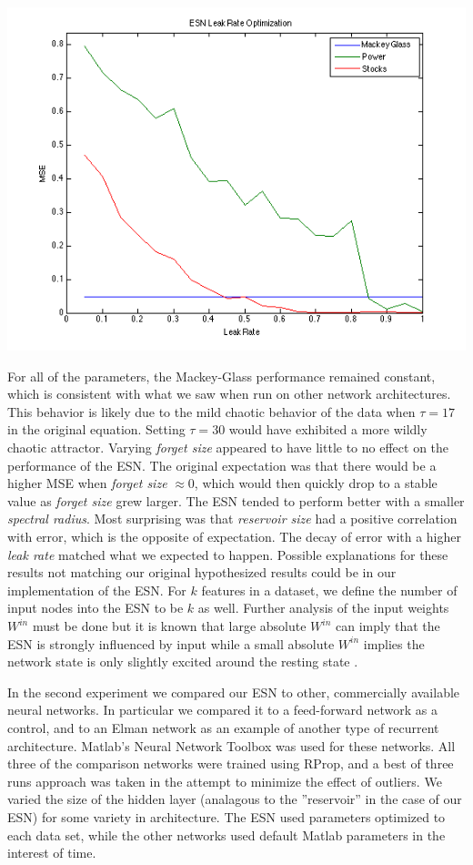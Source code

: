 \documentclass{acm_proc_article-sp}
\begin{document}
\begin{center}
\includegraphics[scale=0.45]{LeakRateOptimization.png}
\end{center}

For all of the parameters, the Mackey-Glass performance remained constant, which is consistent with what we saw when run on other network architectures. This behavior is likely due to the mild chaotic behavior of the data when $\tau = 17$ in the original equation. Setting $\tau = 30$ would have exhibited a more wildly chaotic attractor. Varying \emph{forget size} appeared to have little to no effect on the performance of the ESN. The original expectation was that there would be a higher MSE when \emph{forget size} $\approx 0$, which would then quickly drop to a stable value as \emph{forget size} grew larger. The ESN tended to perform better with a smaller \emph{spectral radius}. Most surprising was that \emph{reservoir size} had a positive correlation with error, which is the opposite of expectation.  The decay of error with a higher \emph{leak rate} matched what we expected to happen.  Possible explanations for these results not matching our original hypothesized results could be in our implementation of the ESN. For $k$ features in a dataset, we define the number of input nodes into the ESN to be $k$ as well. Further analysis of the input weights $W^{in}$ must be done but it is known that large absolute $W^{in}$ can imply that the ESN is strongly influenced by input while a small absolute $W^{in}$ implies the network state is only slightly excited around the resting state \cite{Jaeger2}.

In the second experiment we compared our ESN to other, commercially available neural networks. In particular we compared it to a feed-forward network as a control, and to an Elman network as an example of another type of recurrent architecture. Matlab's Neural Network Toolbox was used for these networks. All three of the comparison networks were trained using RProp, and a best of three runs approach was taken in the attempt to minimize the effect of outliers. We varied the size of the hidden layer (analagous to the ''reservoir'' in the case of our ESN) for some variety in architecture. The ESN used parameters optimized to each data set, while the other networks used default Matlab parameters in the interest of time.
\end{document}
